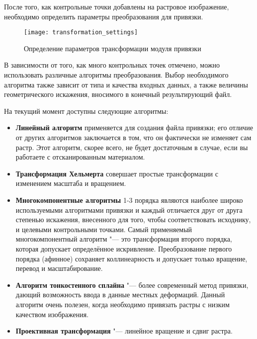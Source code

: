 \label{georeferencer_transformation}

После того, как контрольные точки добавлены на растровое изображение,
необходимо определить параметры преобразования для привязки.

\begin{figure}[ht]
\centering
  \texttt{[image: transformation\_settings]}
  \caption{Определение параметров трансформации модуля привязки \wincaption}\label{fig:georef_transform}
\end{figure}


В зависимости от того, как много контрольных точек отмечено, можно
использовать различные алгоритмы преобразования. Выбор необходимого
алгоритма также зависит от типа и качества входных данных, а также
величины геометрического искажения, вносимого в конечный результирующий
файл.

На текущий момент доступны следующие алгоритмы:

\begin{itemize}[label=--]
\item \textbf{Линейный алгоритм} применяется для создания файла
привязки; его отличие от других алгоритмов заключается в том, что он
фактически не изменяет сам растр. Этот алгоритм, скорее всего, не будет
достаточным в случае, если вы работаете с отсканированным материалом.
\item \textbf{Трансформация Хельмерта} совершает простые трансформации
с изменением масштаба и вращением.
\item \textbf{Многокомпонентные алгоритмы} 1-3 порядка являются
наиболее широко используемыми алгоритмами привязки и каждый отличается
друг от друга степенью искажения, внесенного для того, чтобы
соответствовать исходнику, и целевыми контрольными точками. Самый
применяемый многокомпонентный алгоритм "--- это трансформация второго
порядка, которая допускает определённое искривление. Преобразование
первого порядка (афинное) сохраняет коллинеарность и допускает только
вращение, перевод и масштабирование.
\item \textbf{Алгоритм тонкостенного сплайна} "--- более современный
метод привязки, дающий возможность ввода в данные местных деформаций.
Данный алгоритм очень полезен, когда необходимо привязать растры с
низким качеством изображения.
\item \textbf{Проективная трансформация} "--- линейное вращение и сдвиг
растра.
\end{itemize}

